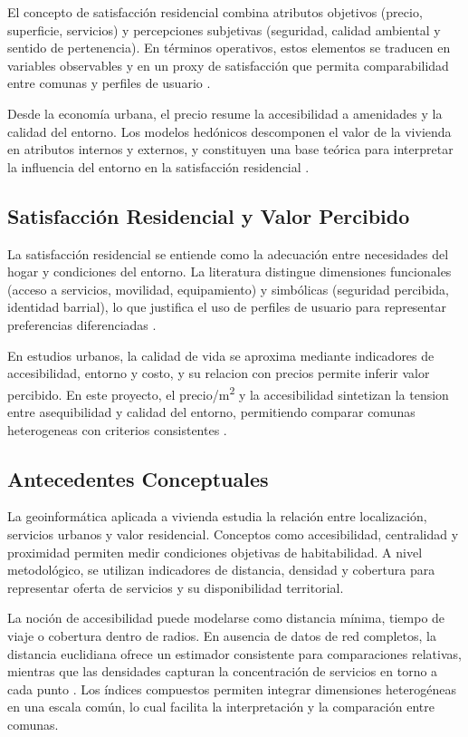 \documentclass[11pt,letterpaper]{article}
\begin{document}
El concepto de satisfacción residencial combina atributos objetivos (precio, superficie, servicios) y percepciones subjetivas (seguridad, calidad ambiental y sentido de pertenencia). En términos operativos, estos elementos se traducen en variables observables y en un proxy de satisfacción que permita comparabilidad entre comunas y perfiles de usuario \cite{marans2015,stoker2019,park2020}.

Desde la economía urbana, el precio resume la accesibilidad a amenidades y la calidad del entorno. Los modelos hedónicos descomponen el valor de la vivienda en atributos internos y externos, y constituyen una base teórica para interpretar la influencia del entorno en la satisfacción residencial \cite{rosen1974,freeman2003,brueckner2011}.
\subsection{Satisfacción Residencial y Valor Percibido}
La satisfacción residencial se entiende como la adecuación entre necesidades del hogar y condiciones del entorno. La literatura distingue dimensiones funcionales (acceso a servicios, movilidad, equipamiento) y simbólicas (seguridad percibida, identidad barrial), lo que justifica el uso de perfiles de usuario para representar preferencias diferenciadas \cite{hidalgo2007,bonaiuto2015}.

En estudios urbanos, la calidad de vida se aproxima mediante indicadores de accesibilidad, entorno y costo, y su relacion con precios permite inferir valor percibido. En este proyecto, el precio/m\textsuperscript{2} y la accesibilidad sintetizan la tension entre asequibilidad y calidad del entorno, permitiendo comparar comunas heterogeneas con criterios consistentes \cite{geurs2004,handy1997}.

\subsection{Antecedentes Conceptuales}
La geoinformática aplicada a vivienda estudia la relación entre localización, servicios urbanos y valor residencial. Conceptos como accesibilidad, centralidad y proximidad permiten medir condiciones objetivas de habitabilidad. A nivel metodológico, se utilizan indicadores de distancia, densidad y cobertura para representar oferta de servicios y su disponibilidad territorial.

La noción de accesibilidad puede modelarse como distancia mínima, tiempo de viaje o cobertura dentro de radios. En ausencia de datos de red completos, la distancia euclidiana ofrece un estimador consistente para comparaciones relativas, mientras que las densidades capturan la concentración de servicios en torno a cada punto \cite{talen2003,wei2018}. Los índices compuestos permiten integrar dimensiones heterogéneas en una escala común, lo cual facilita la interpretación y la comparación entre comunas.
\end{document}
